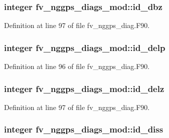 \subsubsection[{id\-\_\-dbz}]{\setlength{\rightskip}{0pt plus 5cm}integer fv\-\_\-nggps\-\_\-diags\-\_\-mod\-::id\-\_\-dbz\hspace{0.3cm}{\ttfamily [private]}}\label{classfv__nggps__diags__mod_a230a7e07e841292812b5e02aaa2b4b25}


Definition at line 97 of file fv\-\_\-nggps\-\_\-diag.\-F90.

\subsubsection[{id\-\_\-delp}]{\setlength{\rightskip}{0pt plus 5cm}integer fv\-\_\-nggps\-\_\-diags\-\_\-mod\-::id\-\_\-delp\hspace{0.3cm}{\ttfamily [private]}}\label{classfv__nggps__diags__mod_aec07245665ff3463d2c2801eae6706b7}


Definition at line 96 of file fv\-\_\-nggps\-\_\-diag.\-F90.

\subsubsection[{id\-\_\-delz}]{\setlength{\rightskip}{0pt plus 5cm}integer fv\-\_\-nggps\-\_\-diags\-\_\-mod\-::id\-\_\-delz\hspace{0.3cm}{\ttfamily [private]}}\label{classfv__nggps__diags__mod_a905a7d18ebee5090090ae09da236114f}


Definition at line 97 of file fv\-\_\-nggps\-\_\-diag.\-F90.

\subsubsection[{id\-\_\-diss}]{\setlength{\rightskip}{0pt plus 5cm}integer fv\-\_\-nggps\-\_\-diags\-\_\-mod\-::id\-\_\-diss\hspace{0.3cm}{\ttfamily [private]}}\label{classfv__nggps__diags__mod_ad4a684d38a9581ad8102dc39d1fe5879}


